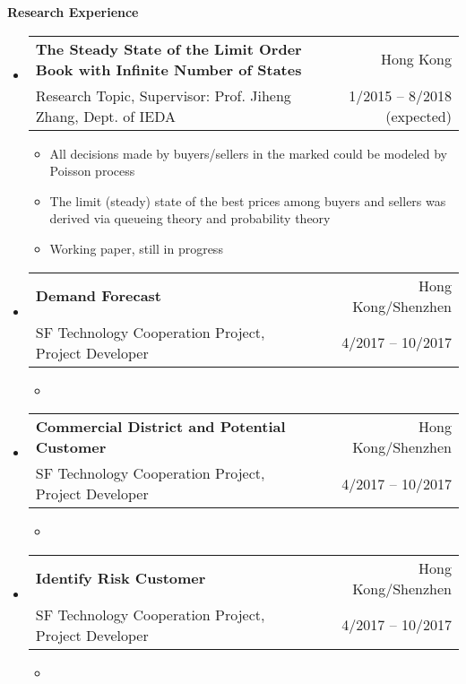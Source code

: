 \documentclass[letterpaper,10pt]{article}
\makeatletter
\newcommand{\resitem}[1]{\item #1 \vspace{-2pt}}
\newcommand{\resheading}[1]{{\large \colorbox{mygrey}{\begin{minipage}{\textwidth}{\textbf{#1 \vphantom{p\^{E}}}}\end{minipage}}}}
\newcommand{\ressubheading}[4]{
\begin{tabular*}{6.5in}{l@{\extracolsep{\fill}}r}
    \textbf{#1} & #2 \\
    #3 & #4 \\
\end{tabular*}\vspace{-6pt}}
\makeatother
\begin{document}
\resheading{Research Experience}
\begin{itemize}
\item
\ressubheading{The Steady State of the Limit Order Book with Infinite Number of States}{Hong Kong}{Research Topic, Supervisor: Prof. Jiheng Zhang, Dept. of IEDA}{1/2015 -- 8/2018 (expected)}
\begin{itemize}
\resitem{All decisions made by buyers/sellers in the marked could be modeled by Poisson process}
\resitem{The limit (steady) state of the best prices among buyers and sellers was derived via queueing theory and probability theory}
\resitem{Working paper, still in progress}
\end{itemize}


\item 
\ressubheading{Demand Forecast}{Hong Kong/Shenzhen}{SF Technology Cooperation Project, Project Developer}{4/2017 -- 10/2017}
\begin{itemize}
\resitem{}
\end{itemize}


\item 
\ressubheading{Commercial District and Potential Customer}{Hong Kong/Shenzhen}{SF Technology Cooperation Project, Project Developer}{4/2017 -- 10/2017}
\begin{itemize}
\resitem{}
\end{itemize}


\item 
\ressubheading{Identify Risk Customer}{Hong Kong/Shenzhen}{SF Technology Cooperation Project, Project Developer}{4/2017 -- 10/2017}
\begin{itemize}
\resitem{}
\end{itemize}





\end{itemize}
\end{document}
